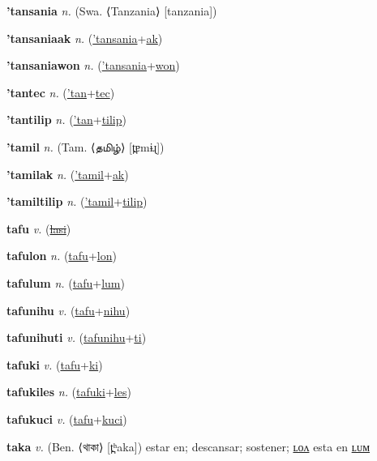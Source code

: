 \textbf{\hypertarget{'tansania}{'tansania}} \textit{n.} (Swa. ⟨Tanzania⟩ [tanzania])


\textbf{\hypertarget{'tansaniaak}{'tansaniaak}} \textit{n.} (\hyperlink{'tansania}{'tansania}+\allowbreak \hyperlink{ak}{ak})


\textbf{\hypertarget{'tansaniawon}{'tansaniawon}} \textit{n.} (\hyperlink{'tansania}{'tansania}+\allowbreak \hyperlink{won}{won})


\textbf{\hypertarget{'tantec}{'tantec}} \textit{n.} (\hyperlink{'tan}{'tan}+\allowbreak \hyperlink{tec}{tec})


\textbf{\hypertarget{'tantilip}{'tantilip}} \textit{n.} (\hyperlink{'tan}{'tan}+\allowbreak \hyperlink{tilip}{tilip})


\textbf{\hypertarget{'tamil}{'tamil}} \textit{n.} (Tam. ⟨{\tamil{}தமிழ்}⟩ [t̪ɐmɨɻ])


\textbf{\hypertarget{'tamilak}{'tamilak}} \textit{n.} (\hyperlink{'tamil}{'tamil}+\allowbreak \hyperlink{ak}{ak})


\textbf{\hypertarget{'tamiltilip}{'tamiltilip}} \textit{n.} (\hyperlink{'tamil}{'tamil}+\allowbreak \hyperlink{tilip}{tilip})


\textbf{\hypertarget{tafu}{tafu}} \textit{v.} (\hyperlink{lasi}{\sout{lasi}})


\textbf{\hypertarget{tafulon}{tafulon}} \textit{n.} (\hyperlink{tafu}{tafu}+\allowbreak \hyperlink{lon}{lon})


\textbf{\hypertarget{tafulum}{tafulum}} \textit{n.} (\hyperlink{tafu}{tafu}+\allowbreak \hyperlink{lum}{lum})


\textbf{\hypertarget{tafunihu}{tafunihu}} \textit{v.} (\hyperlink{tafu}{tafu}+\allowbreak \hyperlink{nihu}{nihu})


\textbf{\hypertarget{tafunihuti}{tafunihuti}} \textit{v.} (\hyperlink{tafunihu}{tafunihu}+\allowbreak \hyperlink{ti}{ti})


\textbf{\hypertarget{tafuki}{tafuki}} \textit{v.} (\hyperlink{tafu}{tafu}+\allowbreak \hyperlink{ki}{ki})


\textbf{\hypertarget{tafukiles}{tafukiles}} \textit{n.} (\hyperlink{tafuki}{tafuki}+\allowbreak \hyperlink{les}{les})


\textbf{\hypertarget{tafukuci}{tafukuci}} \textit{v.} (\hyperlink{tafu}{tafu}+\allowbreak \hyperlink{kuci}{kuci})


\textbf{\hypertarget{taka}{taka}} \textit{v.} (Ben. ⟨{\bengali{}থাকা}⟩ [t̪ʰaka])
estar en; descansar; sostener; \hyperlink{takalon}{ʟᴏᴧ} esta en \hyperlink{takalum}{ʟᴜᴍ}

